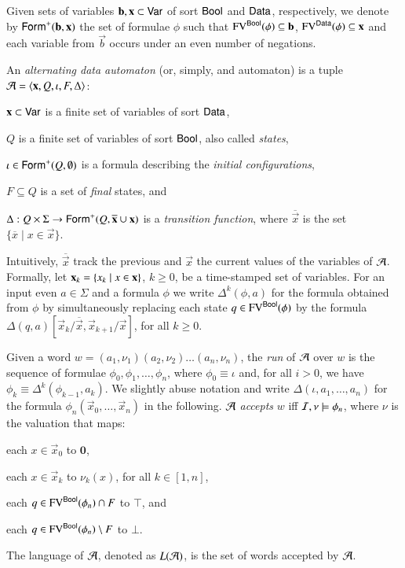 \documentclass{llncs}
\begin{document}
Given sets of variables $\mathbf b,\mathbf x \subset \mathsf{Var}$ of sort
$\mathsf{Bool}$ and $\mathsf{Data}$, respectively, we denote by
$\mathsf{Form}^+(\mathbf b,\mathbf x)$ the set of formulae $\phi$ such that
$\mathrm{FV}^{\mathsf{Bool}}(\phi) \subseteq \mathbf b$, $\mathrm{FV}^{\mathsf{Data}}(\phi) \subseteq
\mathbf x$ and each variable from $\vec{b}$ occurs under an even number
of negations. 

An \emph{alternating data automaton} (or, simply, and automaton) is a
tuple $\mathcal{A} = \left\langle \mathbf x,Q,\iota,F,\Delta \right\rangle$: \begin{compactitem}
%
\item $\mathbf x \subset \mathsf{Var}$ is a finite set of variables of sort
  $\mathsf{Data}$,
%
\item $Q$ is a finite set of variables of sort $\mathsf{Bool}$, also called
  \emph{states},
%
\item $\iota \in \mathsf{Form}^+(Q,\emptyset)$ is a formula describing the
  \emph{initial configurations},
%
\item $F \subseteq Q$ is a set of \emph{final} states, and
%
\item $\Delta : Q \times \Sigma \rightarrow
  \mathsf{Form}^+(Q,\overline{\mathbf x}\cup\mathbf x)$ is a \emph{transition
    function}, where $\overline{\vec{x}}$ is the set $\{\overline{x}
  \mid x \in \vec{x}\}$.
\end{compactitem}
Intuitively, $\overline{\vec{x}}$ track the previous and $\vec{x}$ the
current values of the variables of $\mathcal{A}$. Formally, let $\mathbf x_k =
\left\{ x_k \mid x \in \mathbf x \right\}$, $k\geq0$, be a time-stamped set of
variables. For an input even $a \in \Sigma$ and a formula $\phi$ we
write $\Delta^k(\phi,a)$ for the formula obtained from $\phi$ by
simultaneously replacing each state $q \in \mathrm{FV}^{\mathsf{Bool}}(\phi)$ by the
formula
$\Delta(q,a)[\vec{x}_k/\overline{\vec{x}},\vec{x}_{k+1}/\vec{x}]$, for
all $k\geq0$.

Given a word $w = (a_1,\nu_1)(a_2,\nu_2) \ldots (a_n,\nu_n)$, the
\emph{run} of $\mathcal{A}$ over $w$ is the sequence of formulae
$\phi_0,\phi_1,\ldots,\phi_n$, where $\phi_0 \equiv \iota$ and, for
all $i > 0$, we have $\phi_k \equiv \Delta^k(\phi_{k-1},a_k)$. We
slightly abuse notation and write $\Delta(\iota,a_1,\ldots,a_n)$ for
the formula $\phi_n(\vec{x}_0,\ldots,\vec{x}_n)$ in the
following. $\mathcal{A}$ \emph{accepts} $w$ iff $\mathcal{I},\nu \models \phi_n$, where
$\nu$ is the valuation that maps:\begin{inparaenum}[(1)]
\item each $x \in \vec{x}_0$ to $\mathbf{0}$, 
%
\item each $x \in \vec{x}_k$ to $\nu_k(x)$, for all $k\in[1,n]$, 
%
\item each $q \in \mathrm{FV}^{\mathsf{Bool}}(\phi_n) \cap F$ to $\top$, and 
%
\item each $q \in \mathrm{FV}^{\mathsf{Bool}}(\phi_n) \setminus F$ to $\bot$.
\end{inparaenum}
The language of $\mathcal{A}$, denoted as $L(\mathcal{A})$, is the set of words accepted
by $\mathcal{A}$. 
\end{document}

